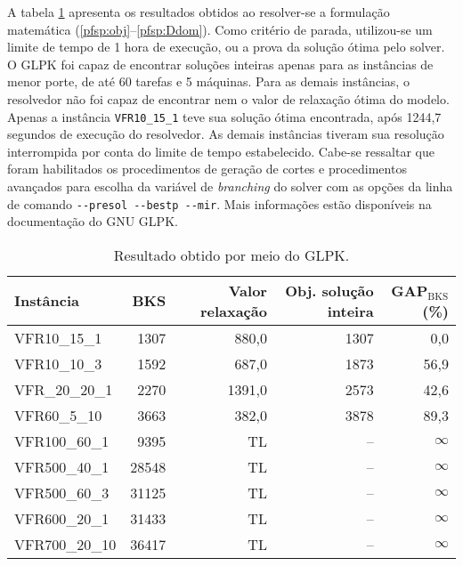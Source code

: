 \documentclass[12pt]{article}
\begin{document}
A tabela \ref{table:results-glpk} apresenta os resultados obtidos ao
resolver-se a formulação matemática (\ref{pfsp:obj}--\ref{pfsp:Ddom}). Como
critério de parada, utilizou-se um limite de tempo de 1 hora de execução, ou
a prova da solução ótima pelo solver. O GLPK foi capaz de encontrar
soluções inteiras apenas para as instâncias de menor porte, de até 60 tarefas e
5 máquinas. Para as demais instâncias, o resolvedor não foi capaz de encontrar
nem o valor de relaxação ótima do modelo. Apenas a instância
\texttt{VFR10\_15\_1} teve sua solução ótima encontrada, após 1244,7 segundos de
execução do resolvedor. As demais instâncias tiveram sua resolução interrompida
por conta do limite de tempo estabelecido. Cabe-se ressaltar que foram
habilitados os procedimentos de geração de cortes e procedimentos avançados
para escolha da variável de \textit{branching} do solver com as opções da
linha de comando \texttt{-{}-presol -{}-bestp -{}-mir}. Mais informações estão
disponíveis na documentação do GNU GLPK.

\begin{table}[ht]
   \centering
   \footnotesize
   \begin{tabular}{lrrrr}
      \toprule
      Instância & BKS & Valor relaxação & Obj. solução inteira & GAP$_\mathrm{BKS}$ (\%) \\
      \midrule
      VFR10\_15\_1 & 1307 & 880,0 & 1307 & \phantom{0}0,0\\
      VFR10\_10\_3 & 1592 & 687,0 & 1873 & 56,9\\
      VFR\_20\_20\_1 & 2270 & 1391,0 & 2573 & 42,6\\
      VFR60\_5\_10 & 3663 & 382,0 & 3878 & 89,3\\
      VFR100\_60\_1 & 9395  &  TL & -- & $\infty$\\
      VFR500\_40\_1 & 28548 &  TL & -- & $\infty$\\
      VFR500\_60\_3 & 31125 &  TL & -- & $\infty$\\
      VFR600\_20\_1 & 31433 &  TL & -- & $\infty$\\
      VFR700\_20\_10 & 36417 & TL & -- & $\infty$\\ 
      \bottomrule
   \end{tabular}
   \caption{Resultado obtido por meio do GLPK.}
   \label{table:results-glpk}
\end{table}
\end{document}
